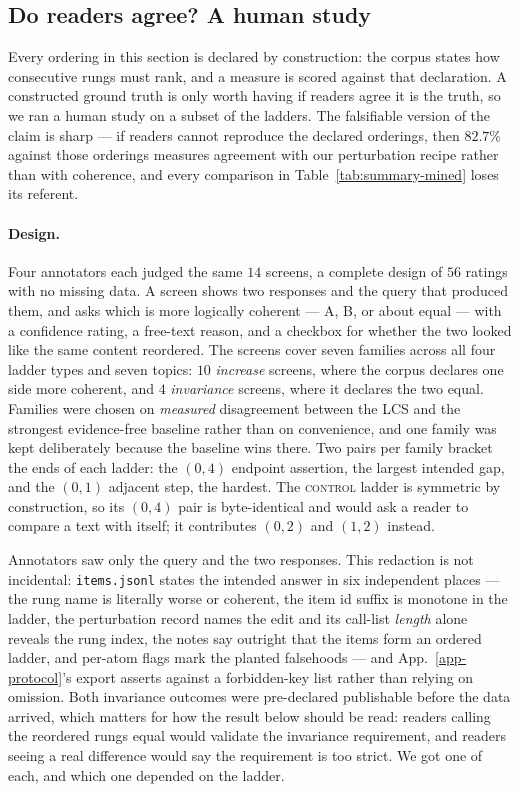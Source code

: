 \subsection{Do readers agree? A human study}
\label{sec-human-study}

Every ordering in this section is declared by construction: the corpus states how consecutive rungs
must rank, and a measure is scored against that declaration. A constructed ground truth is only worth
having if readers agree it is the truth, so we ran a human study on a subset of the ladders. The
falsifiable version of the claim is sharp --- if readers cannot reproduce the declared orderings, then
$82.7\%$ against those orderings measures agreement with our perturbation recipe rather than with
coherence, and every comparison in Table~\ref{tab:summary-mined} loses its referent.

\paragraph{Design.} Four annotators each judged the same $14$ screens, a complete design of $56$
ratings with no missing data. A screen shows two responses and the query that produced them, and asks
which is more logically coherent --- A, B, or about equal --- with a confidence rating, a free-text
reason, and a checkbox for whether the two looked like the same content reordered. The screens cover
seven families across all four ladder types and seven topics: $10$ \emph{increase} screens, where the
corpus declares one side more coherent, and $4$ \emph{invariance} screens, where it declares the two
equal. Families were chosen on \emph{measured} disagreement between the LCS and the strongest
evidence-free baseline rather than on convenience, and one family was kept deliberately because the
baseline wins there. Two pairs per family bracket the ends of each ladder: the $(0,4)$ endpoint
assertion, the largest intended gap, and the $(0,1)$ adjacent step, the hardest. The \textsc{control}
ladder is symmetric by construction, so its $(0,4)$ pair is byte-identical and would ask a reader to
compare a text with itself; it contributes $(0,2)$ and $(1,2)$ instead.

Annotators saw only the query and the two responses. This redaction is not incidental: \texttt{items.jsonl}
states the intended answer in six independent places --- the rung name is literally \textsf{worse} or
\textsf{coherent}, the item id suffix is monotone in the ladder, the perturbation record names the edit
and its call-list \emph{length} alone reveals the rung index, the notes say outright that the items form
an ordered ladder, and per-atom flags mark the planted falsehoods --- and App.~\ref{app-protocol}'s
export asserts against a forbidden-key list rather than relying on omission. Both invariance outcomes
were pre-declared publishable before the data arrived, which matters for how the result below should be
read: readers calling the reordered rungs equal would validate the invariance requirement, and readers
seeing a real difference would say the requirement is too strict. We got one of each, and which one
depended on the ladder.

